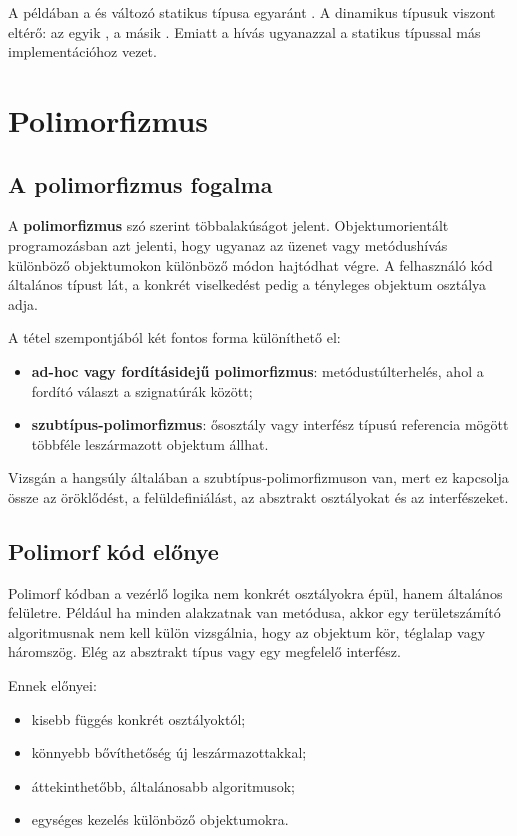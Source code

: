 A példában a  és  változó statikus típusa egyaránt . A dinamikus típusuk viszont eltérő: az egyik , a másik . Emiatt a  hívás ugyanazzal a statikus típussal más implementációhoz vezet.

\section{Polimorfizmus}

\subsection{A polimorfizmus fogalma}

A \textbf{polimorfizmus} szó szerint többalakúságot jelent. Objektumorientált programozásban azt jelenti, hogy ugyanaz az üzenet vagy metódushívás különböző objektumokon különböző módon hajtódhat végre. A felhasználó kód általános típust lát, a konkrét viselkedést pedig a tényleges objektum osztálya adja.

A tétel szempontjából két fontos forma különíthető el:

\begin{itemize}
  \item \textbf{ad-hoc vagy fordításidejű polimorfizmus}: metódustúlterhelés, ahol a fordító választ a szignatúrák között;
  \item \textbf{szubtípus-polimorfizmus}: ősosztály vagy interfész típusú referencia mögött többféle leszármazott objektum állhat.
\end{itemize}

Vizsgán a hangsúly általában a szubtípus-polimorfizmuson van, mert ez kapcsolja össze az öröklődést, a felüldefiniálást, az absztrakt osztályokat és az interfészeket.

\subsection{Polimorf kód előnye}

Polimorf kódban a vezérlő logika nem konkrét osztályokra épül, hanem általános felületre. Például ha minden alakzatnak van  metódusa, akkor egy területszámító algoritmusnak nem kell külön vizsgálnia, hogy az objektum kör, téglalap vagy háromszög. Elég az absztrakt  típus vagy egy megfelelő interfész.

Ennek előnyei:

\begin{itemize}
  \item kisebb függés konkrét osztályoktól;
  \item könnyebb bővíthetőség új leszármazottakkal;
  \item áttekinthetőbb, általánosabb algoritmusok;
  \item egységes kezelés különböző objektumokra.
\end{itemize}


